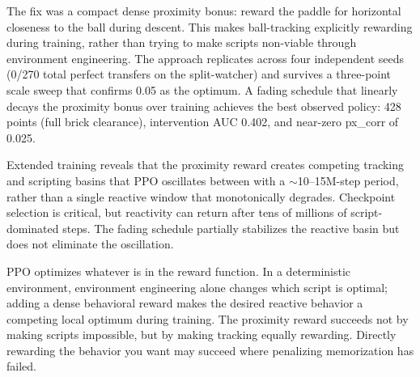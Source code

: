 \documentclass[11pt]{article}
\begin{document}
The fix was a compact dense proximity bonus: reward the paddle for horizontal
closeness to the ball during descent. This makes ball-tracking explicitly
rewarding during training, rather than trying to make scripts non-viable
through environment engineering. The approach replicates across four
independent seeds (0/270 total perfect transfers on the split-watcher) and
survives a three-point scale sweep that confirms 0.05 as the optimum.
A fading schedule that linearly decays the proximity bonus over
training achieves the best observed policy: 428 points (full brick clearance),
intervention AUC 0.402, and near-zero px\_corr of 0.025.

Extended training reveals that the proximity reward creates competing
tracking and scripting basins that PPO oscillates between with a
$\sim$10--15M-step period, rather than a single reactive window that
monotonically degrades. Checkpoint selection is critical, but reactivity
can return after tens of millions of script-dominated steps. The fading
schedule partially stabilizes the reactive basin but does not eliminate the
oscillation.

PPO optimizes whatever is in the reward function. In a
deterministic environment, environment engineering alone changes which script is
optimal; adding a dense behavioral reward makes the desired reactive behavior
a competing local optimum during training. The proximity reward succeeds not
by making scripts impossible, but by making tracking equally rewarding.
Directly rewarding the behavior you want may succeed where penalizing
memorization has failed.
\end{document}
